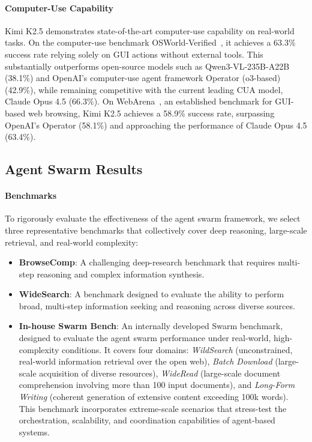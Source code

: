 \paragraph{Computer-Use Capability} Kimi K2.5 demonstrates state-of-the-art computer-use capability on real-world tasks. On the computer-use benchmark OSWorld-Verified~\citep{osworld_verified,OSWorld}, it achieves a 63.3\% success rate relying solely on GUI actions without external tools. This substantially outperforms open-source models such as Qwen3-VL-235B-A22B (38.1\%) and OpenAI’s computer-use agent framework Operator (o3-based) (42.9\%), while remaining competitive with the current leading CUA model, Claude Opus 4.5 (66.3\%). On WebArena~\citep{zhou2023webarena}, an established benchmark for GUI-based web browsing, Kimi K2.5 achieves a 58.9\% success rate, surpassing OpenAI's Operator (58.1\%) and approaching the performance of Claude Opus 4.5 (63.4\%).
\subsection{Agent Swarm Results}
\label{sec:agent_swarm_results}

\paragraph{Benchmarks}
To rigorously evaluate the effectiveness of the agent swarm framework, we select three representative benchmarks that collectively cover deep reasoning, large-scale retrieval, and real-world complexity:

\begin{itemize}
\item \textbf{BrowseComp}: A challenging deep-research benchmark that requires multi-step reasoning and complex information synthesis.

\item \textbf{WideSearch}: A benchmark designed to evaluate the ability to perform broad, multi-step information seeking and reasoning across diverse sources.

\item \textbf{In-house Swarm Bench}: An internally developed Swarm benchmark, designed to evaluate the agent swarm performance under real-world, high-complexity conditions. It covers four domains: \textit{WildSearch} (unconstrained, real-world information retrieval over the open web), \textit{Batch Download} (large-scale acquisition of diverse resources), \textit{WideRead} (large-scale document comprehension involving more than 100 input documents), and \textit{Long-Form Writing} (coherent generation of extensive content exceeding 100k words). This benchmark incorporates extreme-scale scenarios that stress-test the orchestration, scalability, and coordination capabilities of agent-based systems.
\end{itemize}

